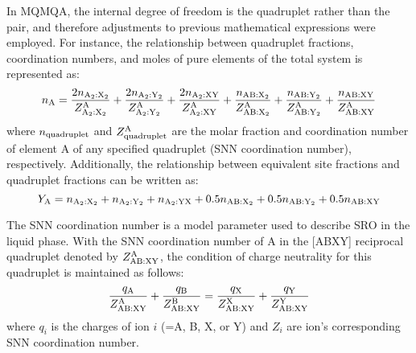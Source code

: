 In MQMQA, the internal degree of freedom is the quadruplet rather than the pair, and therefore adjustments to previous mathematical expressions were employed. For instance, the relationship between quadruplet fractions, coordination numbers, and moles of pure elements of the total system is represented as:
\begin{equation} \label{method:eq:mqmna}
    n_{\rm A}=\frac{{2n}_{{\rm A}_2:{\rm X}_2}}{Z_{{\rm A}_2:{\rm X}_2}^{\rm A}}+\frac{{2n}_{{\rm A}_2:{\rm Y}_2}}{Z_{{\rm A}_2:{\rm Y}_2}^{\rm A}}+\frac{{2n}_{{\rm A}_2:{\rm XY}}}{Z_{{\rm A_2:XY}}^{\rm A}}+\frac{n_{\rm AB:X_2}}{Z_{\rm AB:X_2}^{\rm A}}+\frac{n_{\rm AB:Y_2}}{Z_{\rm AB:Y_2}^{\rm A}}+\frac{n_{\rm AB:XY}}{Z_{\rm AB:XY}^{\rm A}}
\end{equation}
where $n_{\rm quadruplet}$ and $Z_{\rm quadruplet}^{\rm A}$ are the molar fraction and coordination number of element A of any specified quadruplet (SNN coordination number), respectively. Additionally, the relationship between equivalent site fractions and quadruplet fractions can be written as:
\begin{equation} \label{method:eq:mqmqaya}
    Y_{\rm A}=n_{\rm A_2:X_2}+n_{\rm A_2:Y_2}+n_{\rm A_2:YX}+{0.5n}_{\rm AB:X_2}+0.5n_{\rm AB:Y_2}+{0.5n}_{\rm AB:XY}
\end{equation}

The SNN coordination number is a model parameter used to describe SRO \cite{pelton2018phase} in the liquid phase. With the SNN coordination number of A in the [ABXY] reciprocal quadruplet denoted by $Z_{\rm AB:XY}^{\rm A}$, the condition of charge neutrality for this quadruplet is maintained as follows:
\begin{equation}\label{method:eq:mqmqaZ}
    \frac{q_{\rm A}}{Z_{\rm AB:XY}^{\rm A}}+\frac{q_{\rm B}}{Z_{\rm AB:XY}^{\rm B}}=\frac{q_{\rm X}}{Z_{\rm AB:XY}^{\rm X}}+\frac{q_{\rm Y}}{Z_{\rm AB:XY}^{\rm Y}}
\end{equation}
where $q_i$ is the charges of ion $i$ (=A, B, X, or Y) and $Z_i$ are ion’s corresponding SNN coordination number.

